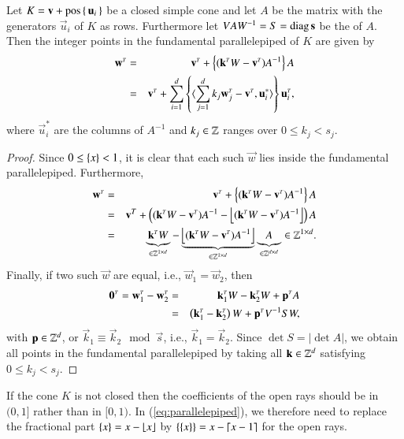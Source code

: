 \begin{lemma}
\label{l:fundamental}
Let $K = \vec v + \poshull \lb\, \vec u_i \,\rb$ be a closed simple cone
and let $A$ be the matrix with the generators $\vec u_i$ of $K$
as rows.
Furthermore let $V A W^{-1} = S = \diag \vec s$ be the  of $A$.
Then the integer points in the fundamental parallelepiped of $K$ are given
by
\begin{eqnarray}
\label{eq:parallelepiped}
\vec w^\T & = & \vec v^\T + \fractional{(\vec k^\T W - \vec v^\T) A^{-1}} A
\\
\nonumber
& = &
\vec v^\T +
\sum_{i=1}^d
    \fractional{\sps{\sum_{j=1}^d k_j \vec w^\T_j - \vec v^\T}{\vec u^*_i}}
	\vec u_i^\T,
\end{eqnarray}
where $\vec u^*_i$ are the columns of $A^{-1}$ and $k_j \in \mathbb{Z}$ ranges
over $0 \le k_j < s_j$.
\end{lemma}

\begin{proof}
Since $0 \le \left\{x\right\} < 1$, it is clear that each such $\vec w$
lies inside the fundamental parallelepiped.
Furthermore,
\begin{eqnarray*}
\vec w^\T & = & \vec v^\T + \fractional{(\vec k^\T W - \vec v^\T) A^{-1}} A
\\
& = &
\vec v^T + 
\left(
(\vec k^\T W - \vec v^\T) A^{-1} - \floor{(\vec k^\T W - \vec v^\T) A^{-1}}
\right) A
\\
& = &
\underbrace{\vec k^\T W\mathstrut}_{\in \ZZ^{1\times d}}
-
\underbrace{\floor{(\vec k^\T W - \vec v^\T) A^{-1}}}_{\in \ZZ^{1\times d}}
\underbrace{A\mathstrut}_{\in \ZZ^{d\times d}} \in \ZZ^{1\times d}.
\end{eqnarray*}
Finally, if two such $\vec w$ are equal, i.e., $\vec w_1 = \vec w_2$,
then
\begin{eqnarray*}
\vec 0^\T = \vec w_1^\T - \vec w_2^\T
& = & \vec k_1^\T W - \vec k_2^\T W + \vec p^\T A
\\
& = & \left(\vec k_1^\T - \vec k_2^\T \right) W + \vec p^\T V^{-1} S W,
\end{eqnarray*}
with $\vec p \in \ZZ^d$,
or $\vec k_1 \equiv \vec k_2 \mod \vec s$, i.e., $\vec k_1 = \vec k_2$.
Since $\det S = \vert\det A\vert$, we obtain all points in the fundamental parallelepiped
by taking all $\vec k \in \ZZ^d$ satisfying $0 \le k_j < s_j$.
\end{proof}

If the cone $K$ is not closed then the coefficients of the open rays
should be in $(0,1]$ rather than in $[0,1)$.
In (\ref{eq:parallelepiped}),
we therefore need to replace the fractional part $\left\{x\right\} = x - \left\lfloor x\right\rfloor$
by $\left\{\left\{x\right\}\right\} = x - \left\lceil x-1\right\rceil$ for the open rays.

